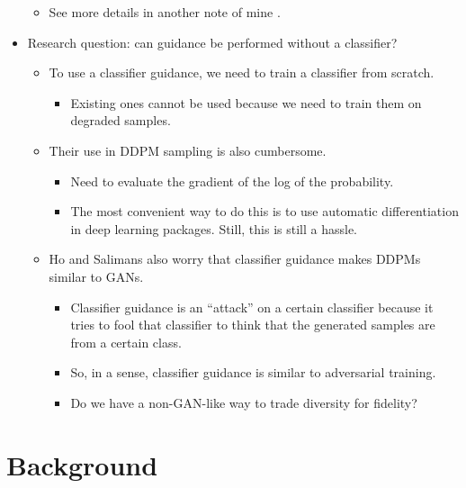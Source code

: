 \documentclass[10pt]{article}
\begin{document}
\begin{itemize}
\begin{itemize}
  \item See more details in another note of mine \cite{Khungurn:2022a}.
\end{itemize}

\item Research question: can guidance be performed without a classifier?
\begin{itemize}
  \item To use a classifier guidance, we need to train a classifier from scratch.
  \begin{itemize}
    \item Existing ones cannot be used because we need to train them on degraded samples.
  \end{itemize}

  \item Their use in DDPM sampling is also cumbersome.
  \begin{itemize}
    \item Need to evaluate the gradient of the log of the probability.
    
    \item The most convenient way to do this is to use automatic differentiation in deep learning packages. Still, this is still a hassle.
  \end{itemize}

  \item Ho and Salimans also worry that classifier guidance makes DDPMs similar to GANs.
    \begin{itemize}
      \item Classifier guidance is an ``attack'' on a certain classifier because it tries to fool that classifier to think that the generated samples are from a certain class.
      
      \item So, in a sense, classifier guidance is similar to adversarial training.
      
      \item Do we have a non-GAN-like way to trade diversity for fidelity?
    \end{itemize}
\end{itemize}
\end{itemize}

\section{Background}
\end{document}
